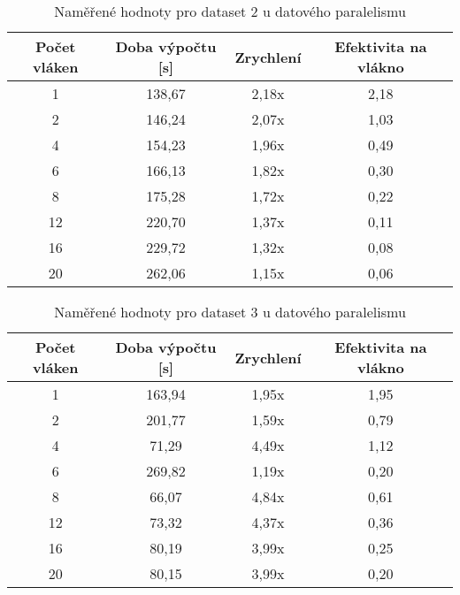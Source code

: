 \documentclass[a4paper,10pt]{article}
\begin{document}
\begin{table}[H]
\centering
\begin{tabular}{|c|c|c|c|}
\hline
Počet vláken & Doba výpočtu {[}s{]} & Zrychlení & Efektivita na vlákno \\ \hline
1            & 138,67               & 2,18x     & 2,18                 \\
2            & 146,24               & 2,07x     & 1,03                 \\
4            & 154,23               & 1,96x     & 0,49                 \\
6            & 166,13               & 1,82x     & 0,30                 \\
8            & 175,28               & 1,72x     & 0,22                 \\
12           & 220,70               & 1,37x     & 0,11                 \\
16           & 229,72               & 1,32x     & 0,08                 \\
20           & 262,06               & 1,15x     & 0,06                 \\ \hline
\end{tabular}
\caption{Naměřené hodnoty pro dataset 2 u datového paralelismu}
\end{table}

\begin{table}[H]
\centering
\begin{tabular}{|c|c|c|c|}
\hline
Počet vláken & Doba výpočtu {[}s{]} & Zrychlení & Efektivita na vlákno \\ \hline
1            & 163,94               & 1,95x     & 1,95                 \\
2            & 201,77               & 1,59x     & 0,79                 \\
4            & 71,29                & 4,49x     & 1,12                 \\
6            & 269,82               & 1,19x     & 0,20                 \\
8            & 66,07                & 4,84x     & 0,61                 \\
12           & 73,32                & 4,37x     & 0,36                 \\
16           & 80,19                & 3,99x     & 0,25                 \\
20           & 80,15                & 3,99x     & 0,20                 \\ \hline
\end{tabular}
\caption{Naměřené hodnoty pro dataset 3 u datového paralelismu}
\end{table}
\end{document}
